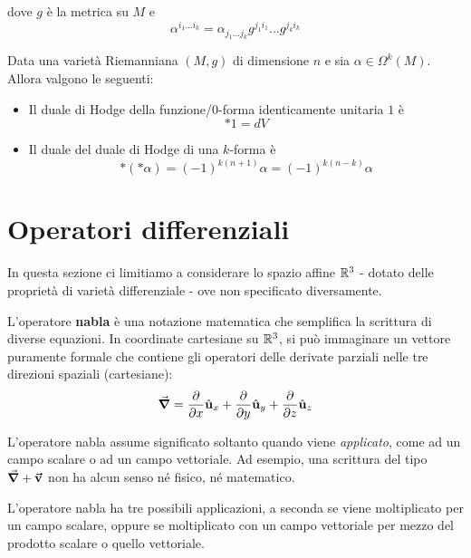 dove $g$ è la metrica su $M$ e
\begin{equation*}
\alpha^{i_1\ldots i_k}=\alpha_{j_1\ldots j_k}g^{j_1i_1}\ldots g^{j_ki_k}
\end{equation*}
\begin{properties}
	Data una varietà Riemanniana $(M,g)$ di dimensione $n$ e sia $\alpha\in\Omega^k(M)$. Allora valgono le seguenti:
	\begin{itemize}
		\item Il duale di Hodge della funzione/$0$-forma identicamente unitaria $1$ è
		\begin{equation}
			\ast 1=dV
		\end{equation}
		\item Il duale del duale di Hodge di una $k$-forma è
		\begin{equation}
			\ast\left(\ast\alpha\right)=\left(-1\right)^{k\left(n+1\right)}\alpha=\left(-1\right)^{k\left(n-k\right)}\alpha
		\end{equation}
		\end{itemize}
\end{properties}
\section{Operatori differenziali}
In questa sezione ci limitiamo a considerare lo spazio affine $\mathbb{R}^3$ - dotato delle proprietà di varietà differenziale - ove non specificato diversamente.
\begin{define}
	L'operatore \textbf{nabla}	è una notazione matematica che semplifica la scrittura di diverse equazioni. In coordinate cartesiane su $\mathbb{R}^3$, si può immaginare un vettore puramente formale che contiene gli operatori delle derivate parziali nelle tre direzioni spaziali (cartesiane):
	\begin{equation}
		\grad = \pdv{x}\hat{\mathbf{u}}_x+\pdv{y}\hat{\mathbf{u}}_y+\pdv{z}\hat{\mathbf{u}}_z
	\end{equation}
\end{define}
\begin{attention}
	L'operatore nabla assume significato soltanto quando viene \textit{applicato}, come ad un campo scalare o ad un campo vettoriale. Ad esempio, una scrittura del tipo $\grad + \vb*{\va{v}}$ non ha alcun senso né fisico, né matematico.
\end{attention}
L'operatore nabla ha tre possibili applicazioni, a seconda se viene moltiplicato per un campo scalare, oppure se moltiplicato con un campo vettoriale per mezzo del prodotto scalare o quello vettoriale.
